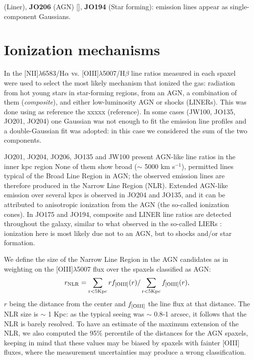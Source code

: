 \documentclass[fleqn,usenatbib]{mnras}
\begin{document}
 (Liner), {\bf JO206} (AGN) [\citet{2017ApJ...844...48P}], {\bf JO194} (Star forming): emission lines appear as  single-component Gaussians.
     
\section{Ionization mechanisms}
\label{sect:analysis}

In  \citet{2017ApJ...844...48P} the [NII]$\lambda$6583/H$\alpha$ vs. [OIII]$\lambda$5007/H$\beta$ line ratios
measured in each spaxel were used to select the most likely mechanism that ionized the gas: radiation from hot young stars in star-forming regions, from an AGN, a combination of them ({\em composite}), and either low-luminosity AGN or shocks (LINERs). This was done using as reference the xxxxx (reference).  In some cases (JW100, JO135, JO201, JO204) one Gaussian was not enough to fit the emission line profiles and a double-Gaussian fit was adopted: in this case we considered the sum of the two components. 

JO201, JO204, JO206, JO135 and JW100 present AGN-like line ratios in the inner kpc region
None of them show broad ($\sim$ 5000 km s$^{-1}$), permitted lines typical of the Broad Line Region in AGN; the observed emission lines are therefore produced in the Narrow Line Region (NLR). Extended AGN-like emission over several kpcs is observed in JO204 and JO135, and it can be attributed to anisotropic ionization from the AGN (the so-called ionization cones).
In JO175 and JO194, composite and LINER line ratios are detected throughout the galaxy, similar to what observed in  the so-called LIERs \citep{2016MNRAS.461.3111B}: ionization here is most likely due not to an AGN, but to shocks and/or star formation.


We define the  size of the Narrow Line Region in the AGN candidates  as in \citet{2017ApJ...837...91B} weighting on the [OIII]$\lambda$5007 flux over the spaxels 
classified as AGN:
\begin{equation}
r_{\rm NLR}=\sum_{\rm{r<5 Kpc}} r f_{\rm[OIII]}(r) /\sum_{\rm{r<5 Kpc}} f_{\rm[OIII]}(r),
\end{equation} 
$r$ being the distance from the center and  $f_{\rm[OIII]}$ the line flux at that distance.
The NLR size is $\sim$ 1 Kpc: as the typical seeing was $\sim$ 0.8-1 arcsec, it follows that the NLR is barely resolved. To have an estimate of the maximum extension of the NLR, we also computed the 95\% percentile of the distances for the AGN spaxels, keeping in mind that these values may be biased by spaxels with fainter [OIII] fluxes, where the measurement uncertainties may produce a wrong classification. 
\end{document}
